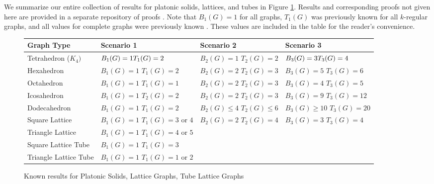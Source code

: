 \documentclass{elsarticle}
\theoremstyle{definition}
\theoremstyle{remark}
\theoremstyle{plain}
\theoremstyle{plain}
\begin{document}
 We summarize our entire collection of results for platonic solids, lattices, and tubes in Figure \ref{tableofresults}. Results and corresponding proofs not given here  are provided in a separate repository of proofs \cite{repository}. Note that $B_1(G)=1$ for all graphs, $T_1(G)$ was previously known for all $k$-regular graphs, and all values for complete graphs were previously known \cite{ellis2014minimal}. These values are included in the table for the reader's convenience.

\begin{figure}[htbp] \centering
\begin{tabularx}{0.9\textwidth}{|l|X|X|X|}
\hline \textbf{Graph Type} & \textbf{Scenario 1} & \textbf{Scenario 2} & \textbf{Scenario 3} \\ \hline 
Tetrahedron ($K_4)$ \footnotemark & $B_1(G) = 1 \newline T_1(G)=2$ & $B_2(G)=1$ \newline $T_2(G)=2$ & $B_3(G)=3 \newline T_3(G)=4$  \\ \hline
Hexahedron & $B_1(G)=1$ \newline $T_1(G)=2$  & $B_2(G)=2$ \newline $T_2(G)=3$ & $B_3(G)=5$ \newline $T_3(G)=6$ \\ \hline
Octahedron & $B_1(G)=1$ \newline $T_1(G)=1$ & $B_2(G)=2$ \newline $T_2(G)=3$ & $B_3(G)=4$ \newline $T_3(G)=5$ \\ \hline 
Icosahedron & $B_1(G)=1$ \newline $T_2(G)=2$ & $B_2(G)=2$ \newline $T_2(G)=3$ & $B_3(G)=9$ \newline $T_3(G)=12$ \\ \hline
Dodecahedron & $B_1(G)=1$ \newline $T_1(G)=2$ & $B_2(G) \leq 4$ \newline $T_2(G) \leq 6$ & $B_3(G) \geq 10$ \newline $T_3(G)= 20$ \\ \hline
Square Lattice & $B_1(G) = 1$ \newline $T_1(G) = 3$ or $4$ \footnotemark & $B_2(G)=2$ \newline $T_2(G) = 4$ \footnotemark & $B_3(G) = 3$ \newline $T_3(G) = 4$ \footnotemark[4] \\ \hline
Triangle Lattice & $B_1(G)=1$ \newline $T_1(G)=4$ or $5$ \footnotemark & & \\ \hline
Square Lattice Tube & $B_1(G)=1$ \newline $T_1(G)=3$ & & \\ \hline
Triangle Lattice Tube & $B_1(G)=1$ \newline $T_1(G)=1$ or $2$ \footnotemark & & \\ \hline
\end{tabularx}
\caption{Known results for Platonic Solids, Lattice Graphs, Tube Lattice Graphs}
\label{tableofresults}
\end{figure}
\end{document}
